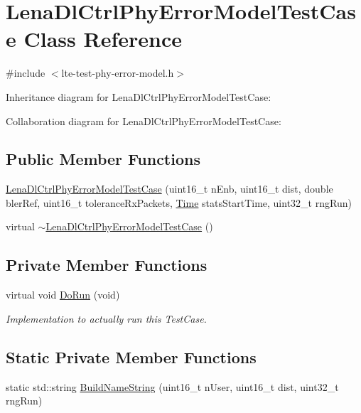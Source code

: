 \hypertarget{classLenaDlCtrlPhyErrorModelTestCase}{}\section{Lena\+Dl\+Ctrl\+Phy\+Error\+Model\+Test\+Case Class Reference}
\label{classLenaDlCtrlPhyErrorModelTestCase}


{\ttfamily \#include $<$lte-\/test-\/phy-\/error-\/model.\+h$>$}



Inheritance diagram for Lena\+Dl\+Ctrl\+Phy\+Error\+Model\+Test\+Case\+:


Collaboration diagram for Lena\+Dl\+Ctrl\+Phy\+Error\+Model\+Test\+Case\+:
\subsection*{Public Member Functions}
\begin{DoxyCompactItemize}
\item 
\hyperlink{classLenaDlCtrlPhyErrorModelTestCase_a616ff78c8dfa480cd0d78e2b1957f9b7}{Lena\+Dl\+Ctrl\+Phy\+Error\+Model\+Test\+Case} (uint16\+\_\+t n\+Enb, uint16\+\_\+t dist, double bler\+Ref, uint16\+\_\+t tolerance\+Rx\+Packets, \hyperlink{classns3_1_1Time}{Time} stats\+Start\+Time, uint32\+\_\+t rng\+Run)
\item 
virtual \hyperlink{classLenaDlCtrlPhyErrorModelTestCase_ad9f5c4c31273d42ac0a4bd09935bfa9a}{$\sim$\+Lena\+Dl\+Ctrl\+Phy\+Error\+Model\+Test\+Case} ()
\end{DoxyCompactItemize}
\subsection*{Private Member Functions}
\begin{DoxyCompactItemize}
\item 
virtual void \hyperlink{classLenaDlCtrlPhyErrorModelTestCase_a1fb7c0a2adfe1083d7e0883b866b0954}{Do\+Run} (void)
\begin{DoxyCompactList}\small\item\em Implementation to actually run this Test\+Case. \end{DoxyCompactList}\end{DoxyCompactItemize}
\subsection*{Static Private Member Functions}
\begin{DoxyCompactItemize}
\item 
static std\+::string \hyperlink{classLenaDlCtrlPhyErrorModelTestCase_ab27b9d64ff863605eb92e16ecffe6f8b}{Build\+Name\+String} (uint16\+\_\+t n\+User, uint16\+\_\+t dist, uint32\+\_\+t rng\+Run)
\end{DoxyCompactItemize}
